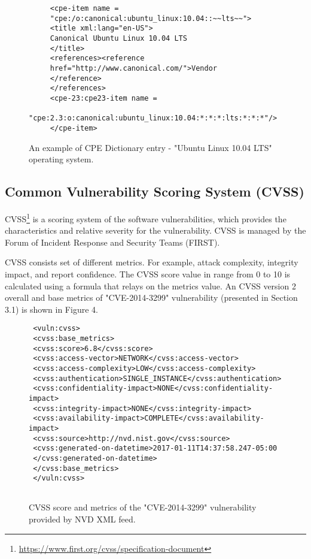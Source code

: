 \documentclass{llncs}
\begin{document}
  \begin{figure}
   
     \lstset{language=XML}
      \begin{lstlisting}
     <cpe-item name =
     "cpe:/o:canonical:ubuntu_linux:10.04::~~lts~~">
     <title xml:lang="en-US">
     Canonical Ubuntu Linux 10.04 LTS
     </title>
     <references><reference 
     href="http://www.canonical.com/">Vendor
     </reference>
     </references>
     <cpe-23:cpe23-item name =
    "cpe:2.3:o:canonical:ubuntu_linux:10.04:*:*:*:lts:*:*:*"/>
     </cpe-item>
      \end{lstlisting}
     \caption{An example of CPE Dictionary entry - "Ubuntu Linux 10.04 LTS" operating system.}
      \end{figure}
  
  
 \subsection{Common Vulnerability Scoring System (CVSS)}
 
 \par CVSS\footnote{\url{https://www.first.org/cvss/specification-document}} is a scoring system of the software  vulnerabilities, which provides the characteristics and relative severity for the vulnerability. CVSS is managed by the Forum of Incident Response and Security Teams (FIRST).
 
 \par CVSS consists set of different metrics. For example, attack complexity, integrity impact, and report confidence. The CVSS score value in range from 0 to 10  is calculated using a formula that relays on the metrics value. An CVSS version 2 overall and  base metrics of "CVE-2014-3299" vulnerability (presented in Section 3.1) is shown in Figure 4.
 
 \begin{figure}
    \centering
      \lstset{language=XML}
       \begin{lstlisting}
 <vuln:cvss>
 <cvss:base_metrics>
 <cvss:score>6.8</cvss:score>
 <cvss:access-vector>NETWORK</cvss:access-vector>
 <cvss:access-complexity>LOW</cvss:access-complexity>
 <cvss:authentication>SINGLE_INSTANCE</cvss:authentication>
 <cvss:confidentiality-impact>NONE</cvss:confidentiality-impact>
 <cvss:integrity-impact>NONE</cvss:integrity-impact>
 <cvss:availability-impact>COMPLETE</cvss:availability-impact>
 <cvss:source>http://nvd.nist.gov</cvss:source>
 <cvss:generated-on-datetime>2017-01-11T14:37:58.247-05:00
 </cvss:generated-on-datetime>
 </cvss:base_metrics>
 </vuln:cvss>
 
       \end{lstlisting}
      \caption{CVSS score and metrics of the "CVE-2014-3299" vulnerability provided by NVD XML feed.}
       \end{figure}
\end{document}
